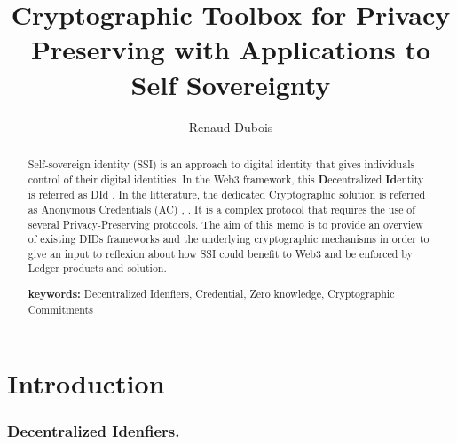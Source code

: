 \documentclass[11pt]{llncs2e/llncs}
\begin{document}
\title{Cryptographic Toolbox for Privacy Preserving with Applications to Self Sovereignty}
 
   \author{
    Renaud Dubois}
    


\maketitle


\begin{abstract}

Self-sovereign identity (SSI) is an approach to digital identity that gives individuals control of their digital identities. In the Web3 framework, this {\bf D}ecentralized {\bf Id}entity is referred as DId \cite{W3CDId21}. In the litterature, the dedicated Cryptographic solution is referred as Anonymous Credentials (AC) \cite{CL02}, \cite{CL04}. It is a complex protocol that requires the use of several Privacy-Preserving protocols. 
The aim of this memo is to provide an overview of existing DIDs frameworks and the underlying cryptographic mechanisms in order to give an input to reflexion about how SSI could benefit to Web3 and be enforced by Ledger products and solution. 

{\bf keywords:}{  Decentralized Idenfiers,  Credential, Zero knowledge, Cryptographic Commitments}
\end{abstract}

\section*{Introduction}

\subsubsection{Decentralized Idenfiers.}
\end{document}
